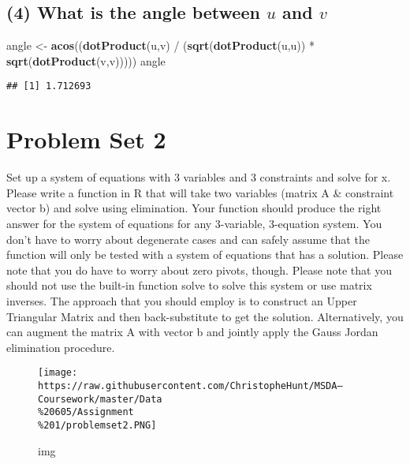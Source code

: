 \documentclass[]{article}
\newenvironment{Shaded}{\begin{snugshade}}{\end{snugshade}}
\newcommand{\KeywordTok}[1]{\textcolor[rgb]{0.13,0.29,0.53}{\textbf{{#1}}}}
\newcommand{\StringTok}[1]{\textcolor[rgb]{0.31,0.60,0.02}{{#1}}}
\newcommand{\NormalTok}[1]{{#1}}
\begin{document}
\subsection{\texorpdfstring{(4) What is the angle between \(u\) and
\(v\)}{(4) What is the angle between u and v}}\label{what-is-the-angle-between-u-and-v}

\begin{Shaded}
\begin{Highlighting}[]
\NormalTok{angle <-}\StringTok{ }\KeywordTok{acos}\NormalTok{((}\KeywordTok{dotProduct}\NormalTok{(u,v) /}\StringTok{ }\NormalTok{(}\KeywordTok{sqrt}\NormalTok{(}\KeywordTok{dotProduct}\NormalTok{(u,u)) *}\StringTok{ }\KeywordTok{sqrt}\NormalTok{(}\KeywordTok{dotProduct}\NormalTok{(v,v)))))}
\NormalTok{angle}
\end{Highlighting}
\end{Shaded}

\begin{verbatim}
## [1] 1.712693
\end{verbatim}

\section{Problem Set 2}\label{problem-set-2}

Set up a system of equations with 3 variables and 3 constraints and
solve for x. Please write a function in R that will take two variables
(matrix A \& constraint vector b) and solve using elimination. Your
function should produce the right answer for the system of equations for
any 3-variable, 3-equation system. You don't have to worry about
degenerate cases and can safely assume that the function will only be
tested with a system of equations that has a solution. Please note that
you do have to worry about zero pivots, though. Please note that you
should not use the built-in function solve to solve this system or use
matrix inverses. The approach that you should employ is to construct an
Upper Triangular Matrix and then back-substitute to get the solution.
Alternatively, you can augment the matrix A with vector b and jointly
apply the Gauss Jordan elimination procedure.

\begin{figure}
\centering
\texttt{[image: https://raw.githubusercontent.com/ChristopheHunt/MSDA---Coursework/master/Data\\\%20605/Assignment\\\%201/problemset2.PNG]}
\caption{img}
\end{figure}
\end{document}
